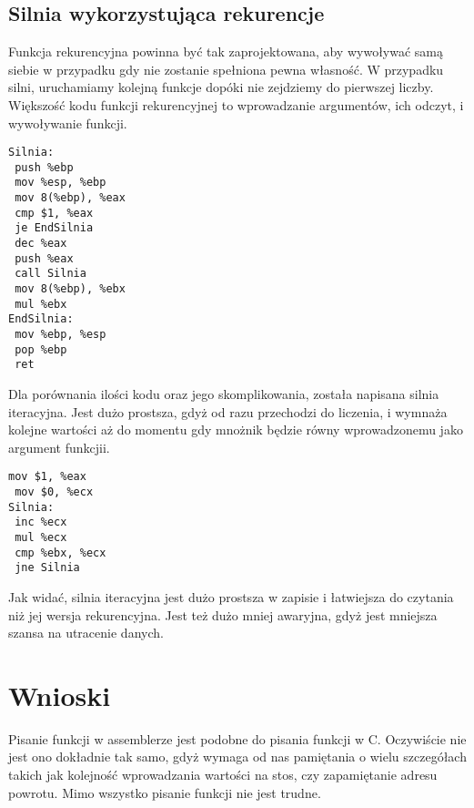 \subsection{Silnia wykorzystująca rekurencje}
Funkcja rekurencyjna powinna być tak zaprojektowana, aby wywoływać samą siebie w przypadku gdy nie zostanie spełniona pewna własność. W przypadku silni, uruchamiamy kolejną funkcje dopóki nie zejdziemy do pierwszej liczby. Większość kodu funkcji rekurencyjnej to wprowadzanie argumentów, ich odczyt, i wywoływanie funkcji.
\begin{lstlisting}[frame=single, basicstyle=\small, caption=Silnia - rekurencyjnie]
Silnia:
 push %ebp
 mov %esp, %ebp
 mov 8(%ebp), %eax
 cmp $1, %eax
 je EndSilnia
 dec %eax
 push %eax
 call Silnia
 mov 8(%ebp), %ebx
 mul %ebx
EndSilnia:
 mov %ebp, %esp
 pop %ebp
 ret
\end{lstlisting}

Dla porównania ilości kodu oraz jego skomplikowania, została napisana silnia iteracyjna. Jest dużo prostsza, gdyż od razu przechodzi do liczenia, i wymnaża kolejne wartości aż do momentu gdy mnożnik będzie równy wprowadzonemu jako argument funkcjii.
\begin{lstlisting}[frame=single, basicstyle=\small, caption=Silnia - iteracyjnie]
 mov $1, %eax
 mov $0, %ecx
Silnia:
 inc %ecx
 mul %ecx
 cmp %ebx, %ecx
 jne Silnia
\end{lstlisting}
Jak widać, silnia iteracyjna jest dużo prostsza w zapisie i łatwiejsza do czytania niż jej wersja rekurencyjna. Jest też dużo mniej awaryjna, gdyż jest mniejsza szansa na utracenie danych.
\section{Wnioski}
Pisanie funkcji w assemblerze jest podobne do pisania funkcji w C. Oczywiście nie jest ono dokładnie tak samo, gdyż wymaga od nas pamiętania o wielu szczegółach takich jak kolejność wprowadzania wartości na stos, czy zapamiętanie adresu powrotu. Mimo wszystko pisanie funkcji nie jest trudne. 